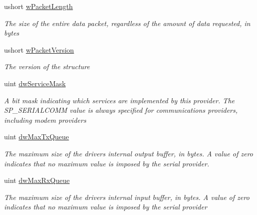 \begin{DoxyCompactItemize}
\item 
ushort \mbox{\hyperlink{struct_r_j_c_p_1_1_i_o_1_1_ports_1_1_native_1_1_windows_1_1_native_methods_1_1_comm_prop_a75141afc157dd3b6714266b89d63f99c}{w\+Packet\+Length}}
\begin{DoxyCompactList}\small\item\em The size of the entire data packet, regardless of the amount of data requested, in bytes \end{DoxyCompactList}\item 
ushort \mbox{\hyperlink{struct_r_j_c_p_1_1_i_o_1_1_ports_1_1_native_1_1_windows_1_1_native_methods_1_1_comm_prop_a579629c742ed914537ca579f201c3ba3}{w\+Packet\+Version}}
\begin{DoxyCompactList}\small\item\em The version of the structure \end{DoxyCompactList}\item 
uint \mbox{\hyperlink{struct_r_j_c_p_1_1_i_o_1_1_ports_1_1_native_1_1_windows_1_1_native_methods_1_1_comm_prop_a1c0471e4fd83977bb830c3d53308f275}{dw\+Service\+Mask}}
\begin{DoxyCompactList}\small\item\em A bit mask indicating which services are implemented by this provider. The S\+P\+\_\+\+S\+E\+R\+I\+A\+L\+C\+O\+MM value is always specified for communications providers, including modem providers \end{DoxyCompactList}\item 
uint \mbox{\hyperlink{struct_r_j_c_p_1_1_i_o_1_1_ports_1_1_native_1_1_windows_1_1_native_methods_1_1_comm_prop_abdc156d3d158840281478898db5acffc}{dw\+Max\+Tx\+Queue}}
\begin{DoxyCompactList}\small\item\em The maximum size of the driver\textquotesingle{}s internal output buffer, in bytes. A value of zero indicates that no maximum value is imposed by the serial provider. \end{DoxyCompactList}\item 
uint \mbox{\hyperlink{struct_r_j_c_p_1_1_i_o_1_1_ports_1_1_native_1_1_windows_1_1_native_methods_1_1_comm_prop_a9496496ea68a920905c6c1c5b86d960c}{dw\+Max\+Rx\+Queue}}
\begin{DoxyCompactList}\small\item\em The maximum size of the driver\textquotesingle{}s internal input buffer, in bytes. A value of zero indicates that no maximum value is imposed by the serial provider \end{DoxyCompactList}\item 

\end{DoxyCompactItemize}
